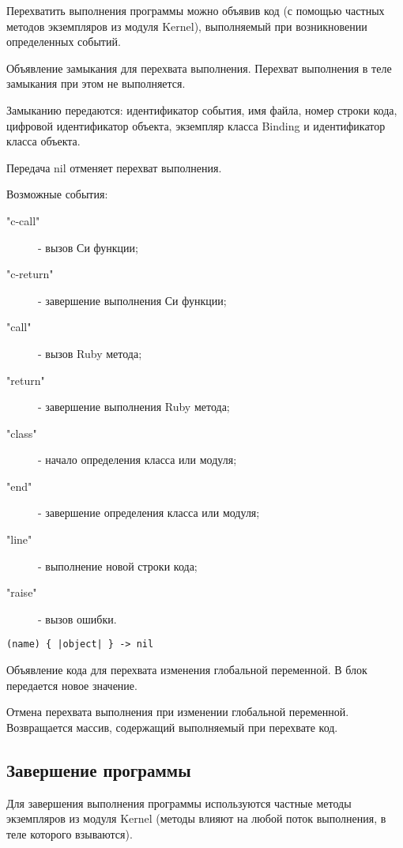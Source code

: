 Перехватить выполнения программы можно объявив код (с помощью частных методов экземпляров из модуля Kernel), выполняемый при возникновении определенных событий.

\begin{methodlist}
  Объявление замыкания для перехвата выполнения. Перехват выполнения в теле замыкания при этом не выполняется.
  
  Замыканию передаются: идентификатор события, имя файла, номер строки кода, цифровой идентификатор объекта, экземпляр класса Binding и идентификатор класса объекта.

  Передача nil отменяет перехват выполнения.
  
  Возможные события:
  \begin{description}
    \item["c-call"] - вызов Си функции;
    \item["c-return"] - завершение выполнения Си функции;
    \item["call"] - вызов Ruby метода;
    \item["return"] - завершение выполнения Ruby метода;
    \item["class"] - начало определения класса или модуля;
    \item["end"] - завершение определения класса или модуля;
    \item["line"] - выполнение новой строки кода;
    \item["raise"] - вызов ошибки. 
  \end{description}

  \verb!(name) { |object| } -> nil!
  
  Объявление кода для перехвата изменения глобальной переменной. В блок передается новое значение.

  Отмена перехвата выполнения при изменении глобальной переменной. Возвращается массив, содержащий выполняемый при перехвате код.
\end{methodlist}

\subsection{Завершение программы}

Для завершения выполнения программы используются частные методы экземпляров из модуля Kernel (методы влияют на любой поток выполнения, в теле которого взываются).

